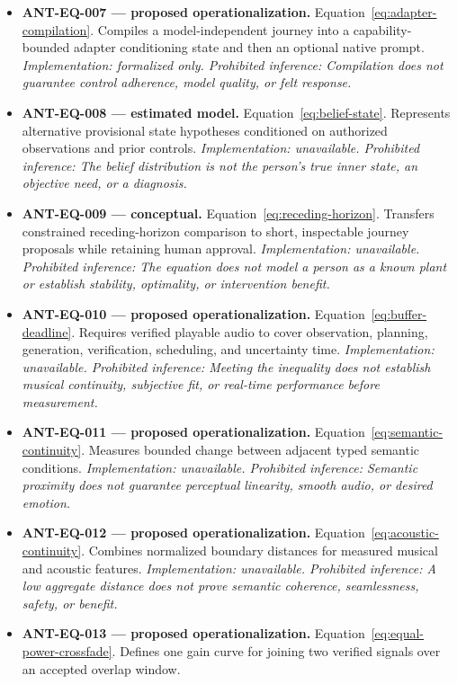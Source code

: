 \begin{itemize}[leftmargin=1.35em,itemsep=0.72em]
  \textit{Implementation: formalized only. Prohibited inference: Typed composition is not raw text concatenation or evidence of perceptually linear mixing.}
  \item \textbf{ANT-EQ-007 --- proposed operationalization.} Equation~\ref{eq:adapter-compilation}. Compiles a model-independent journey into a capability-bounded adapter conditioning state and then an optional native prompt.
  \textit{Implementation: formalized only. Prohibited inference: Compilation does not guarantee control adherence, model quality, or felt response.}
  \item \textbf{ANT-EQ-008 --- estimated model.} Equation~\ref{eq:belief-state}. Represents alternative provisional state hypotheses conditioned on authorized observations and prior controls.
  \textit{Implementation: unavailable. Prohibited inference: The belief distribution is not the person's true inner state, an objective need, or a diagnosis.}
  \item \textbf{ANT-EQ-009 --- conceptual.} Equation~\ref{eq:receding-horizon}. Transfers constrained receding-horizon comparison to short, inspectable journey proposals while retaining human approval.
  \textit{Implementation: unavailable. Prohibited inference: The equation does not model a person as a known plant or establish stability, optimality, or intervention benefit.}
  \item \textbf{ANT-EQ-010 --- proposed operationalization.} Equation~\ref{eq:buffer-deadline}. Requires verified playable audio to cover observation, planning, generation, verification, scheduling, and uncertainty time.
  \textit{Implementation: unavailable. Prohibited inference: Meeting the inequality does not establish musical continuity, subjective fit, or real-time performance before measurement.}
  \item \textbf{ANT-EQ-011 --- proposed operationalization.} Equation~\ref{eq:semantic-continuity}. Measures bounded change between adjacent typed semantic conditions.
  \textit{Implementation: unavailable. Prohibited inference: Semantic proximity does not guarantee perceptual linearity, smooth audio, or desired emotion.}
  \item \textbf{ANT-EQ-012 --- proposed operationalization.} Equation~\ref{eq:acoustic-continuity}. Combines normalized boundary distances for measured musical and acoustic features.
  \textit{Implementation: unavailable. Prohibited inference: A low aggregate distance does not prove semantic coherence, seamlessness, safety, or benefit.}
  \item \textbf{ANT-EQ-013 --- proposed operationalization.} Equation~\ref{eq:equal-power-crossfade}. Defines one gain curve for joining two verified signals over an accepted overlap window.

\end{itemize}
